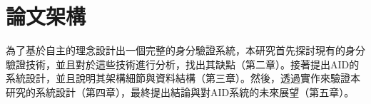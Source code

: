 \section{論文架構}
為了基於自主的理念設計出一個完整的身分驗證系統，本研究首先探討現有的身分驗證技術，並且對於這些技術進行分析，找出其缺點（第二章）。接著提出AID的系統設計，並且說明其架構細節與資料結構（第三章）。然後，透過實作來驗證本研究的系統設計（第四章），最終提出結論與對AID系統的未來展望（第五章）。